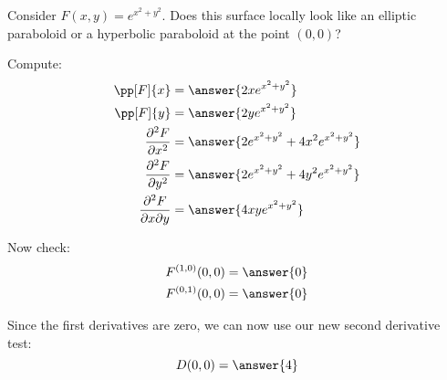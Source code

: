 \documentclass{ximera}
\begin{document}
\begin{question}
  Consider $F(x,y) = e^{x^2+y^2}$. Does this surface locally look like
  an elliptic paraboloid or a hyperbolic paraboloid at the point
  $(0,0)$?
  \begin{prompt}
    Compute:
    \begin{align*}
      \pp[F]{x} &= \answer{2x e^{x^2+y^2}}\\
      \pp[F]{y} &= \answer{2y e^{x^2+y^2}}\\
      \frac{\partial^2F}{\partial x^2} &= \answer{2 e^{x^2+y^2}+4x^2 e^{x^2+y^2}}\\
      \frac{\partial^2F}{\partial y^2} &= \answer{2 e^{x^2+y^2}+4y^2 e^{x^2+y^2}}\\
      \frac{\partial^2F}{\partial x\partial y} &= \answer{4 x y e^{x^2+y^2}}\\
    \end{align*}
    \begin{question}
      Now check:
      \begin{align*}
        F^{(1,0)}(0,0) &= \answer{0}\\
        F^{(0,1)}(0,0) &= \answer{0}        
      \end{align*}
      \begin{question}
        Since the first derivatives are zero, we can now use our new second derivative test:
        \[
        D(0,0) = \answer{4}
        \]
        \begin{question}
          \begin{multipleChoice}
          \end{multipleChoice}
        \end{question}
      \end{question}
    \end{question}
  \end{prompt}
\end{question}
\end{document}

